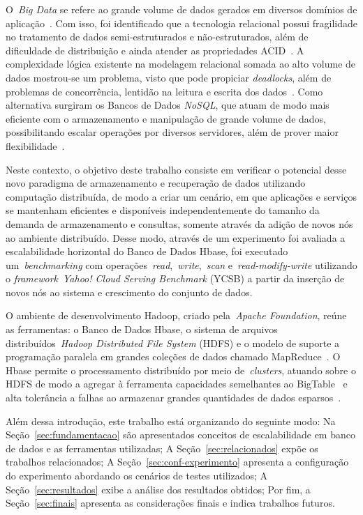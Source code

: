 \documentclass[12pt]{article}
\begin{document}
O~\textit{Big Data} se refere ao grande volume de dados gerados em diversos domínios de aplicação~\cite{han2011survey}. 
Com isso, foi identificado que a tecnologia relacional possui fragilidade no tratamento de dados semi-estruturados e não-estruturados, além de dificuldade de distribuição e ainda atender as propriedades ACID~\cite{aparicio:2016}. 
A complexidade lógica existente na modelagem relacional somada ao alto volume de dados mostrou-se um problema, visto que pode propiciar \textit{deadlocks}, além de problemas de concorrência, lentidão na leitura e escrita dos dados~\cite{han2011survey}. 
Como alternativa surgiram os Bancos de Dados \textit{NoSQL}, que atuam de modo mais eficiente com o armazenamento e manipulação de grande volume de dados, possibilitando escalar operações por diversos servidores, além de prover maior flexibilidade~\cite{ramesh:2016}.

Neste contexto, o objetivo deste trabalho consiste em verificar o potencial desse novo paradigma de armazenamento e recuperação de dados utilizando computação distribuída, de modo a criar um cenário, em que aplicações e serviços se mantenham eficientes e disponíveis independentemente do tamanho da demanda de armazenamento e consultas, somente através da adição de novos nós ao ambiente distribuído. Desse modo, através de um experimento foi avaliada a escalabilidade horizontal do Banco de Dados Hbase, foi executado um~\emph{benchmarking} com operações~\emph{read},~\emph{write},~\emph{scan} e~\emph{read-modify-write} utilizando o \textit{framework}~\emph{Yahoo! Cloud Serving Benchmark} (YCSB) a partir da inserção de novos nós ao sistema e crescimento do conjunto de dados.

O ambiente de desenvolvimento Hadoop, criado pela~\emph{Apache Foundation}, reúne as ferramentas: o Banco de Dados Hbase, o sistema de arquivos distribuídos~\emph{Hadoop Distributed File System} (HDFS) e o modelo de suporte a programação paralela em grandes coleções de dados chamado MapReduce~\cite{hadoophbase}. O Hbase permite o processamento distribuído por meio de~\emph{clusters}, atuando sobre o HDFS de modo a agregar à ferramenta capacidades semelhantes ao BigTable~\cite{chang2008bigtable} e alta tolerância a falhas ao armazenar grandes quantidades de dados esparsos~\cite{hadoophbase}.

Além dessa introdução, este trabalho está organizando do seguinte modo: Na Seção~\ref{sec:fundamentacao} são apresentados conceitos de escalabilidade em banco de dados e as ferramentas utilizadas; A Seção~\ref{sec:relacionados} expõe os trabalhos relacionados; A Seção~\ref{sec:conf-experimento} apresenta a configuração do experimento abordando os cenários de testes utilizados; A Seção~\ref{sec:resultados} exibe a análise dos resultados obtidos; Por fim, a Seção~\ref{sec:finais} apresenta as considerações finais e indica trabalhos futuros.
\end{document}

